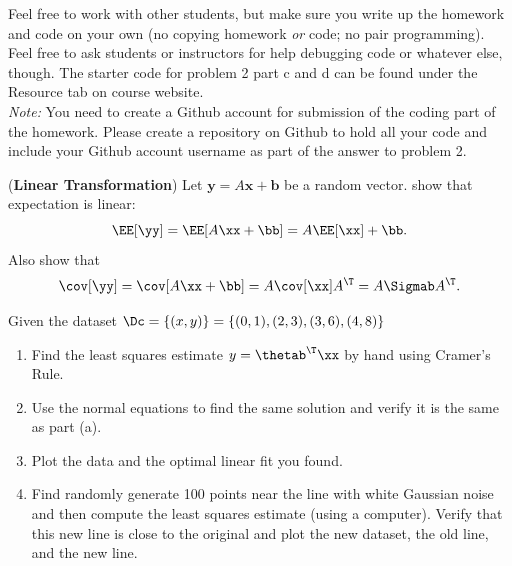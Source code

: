\documentclass[12pt,letterpaper]{hmcpset}
\begin{document}
Feel free to work with other students, but make sure you write up the homework
and code on your own (no copying homework \textit{or} code; no pair programming).
Feel free to ask students or instructors for help debugging code or whatever else,
though.
The starter code for problem 2 part c and d can be found under the Resource tab on course website.\\

\textit{Note:} You need to create a Github account for submission of the coding part of the homework. Please create a repository on Github to hold all your code and include your Github account username as part of the answer to problem 2.

\begin{problem}[1]
(\textbf{Linear Transformation}) Let $\mathbf{y} = A\mathbf{x} + \mathbf{b}$ be a random vector.
show that expectation is linear:
\[
    \EE[\yy] = \EE[A\xx + \bb] = A\EE[\xx] + \bb.
\]
Also show that
\[
    \cov[\yy] = \cov[A\xx + \bb] = A \cov[\xx] A^\T = A\Sigmab A^\T.
\]
\end{problem}
\begin{solution}
    \vfill
\end{solution}
\newpage




\begin{problem}[2]
Given the dataset $\Dc = \{(x,y)\} = \{(0,1), (2,3), (3,6), (4,8)\}$
\begin{enumerate}
   \item Find the least squares estimate $y = \thetab^\T\xx$ by hand using
        Cramer's Rule.
    \item Use the normal equations to find the same solution and verify it
        is the same as part (a).
    \item Plot the data and the optimal linear fit you found.
    \item Find randomly generate 100 points near the line with white Gaussian
        noise and then compute the least squares estimate (using a computer).
        Verify that this new line is close to the original and plot the new
        dataset, the old line, and the new line.
\end{enumerate}

\end{problem}
\begin{solution}
    \vfill
\end{solution}
\newpage
\end{document}
